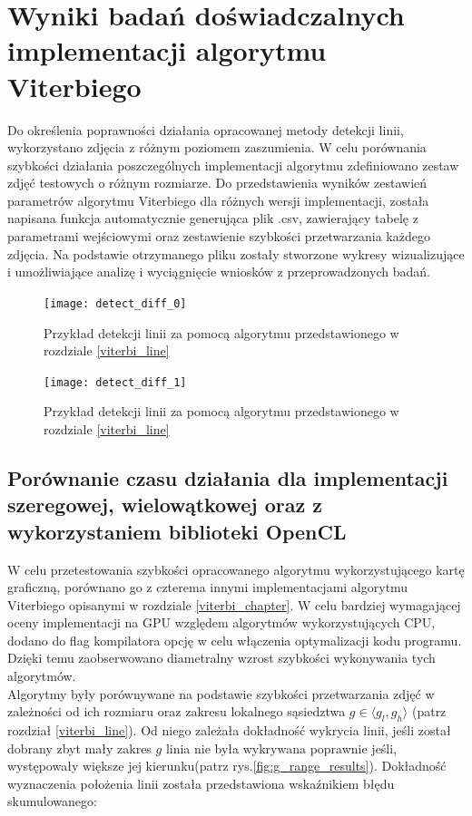 \documentclass[document.tex]{subfiles}
\begin{document}
\chapter{Wyniki badań doświadczalnych \\ implementacji algorytmu Viterbiego} \label{chapter_3}
\indent Do określenia poprawności działania opracowanej metody detekcji linii, 
wykorzystano zdjęcia z różnym poziomem zaszumienia. W celu porównania szybkości
działania poszczególnych implementacji algorytmu zdefiniowano zestaw zdjęć testowych
o różnym rozmiarze. Do przedstawienia wyników zestawień parametrów algorytmu Viterbiego
dla różnych wersji implementacji, została napisana funkcja automatycznie generująca plik .csv,
zawierający tabelę z parametrami wejściowymi oraz zestawienie szybkości przetwarzania każdego zdjęcia.
Na podstawie otrzymanego pliku zostały stworzone wykresy wizualizujące i umożliwiające
analizę i wyciągnięcie wniosków z przeprowadzonych badań.

\begin{figure}[h]
\texttt{[image: detect\_diff\_0]}
\caption{Przykład detekcji linii za pomocą algorytmu przedstawionego w rozdziale \ref{viterbi_line}}
\label{fig:sample_detect_0}
\end{figure}

\clearpage

\begin{figure}[h]
\texttt{[image: detect\_diff\_1]}
\caption{Przykład detekcji linii za pomocą algorytmu przedstawionego w rozdziale \ref{viterbi_line}}
\label{fig:sample_detect_1}
\end{figure}

\section{Porównanie czasu działania dla implementacji szeregowej, wielowątkowej
oraz z wykorzystaniem biblioteki OpenCL}
\indent W celu przetestowania szybkości opracowanego algorytmu wykorzystującego
kartę graficzną, porównano go z czterema innymi implementacjami algorytmu Viterbiego opisanymi
w rozdziale \ref{viterbi_chapter}.
W celu bardziej wymagającej oceny implementacji na GPU względem algorytmów wykorzystujących CPU, dodano
do flag kompilatora opcję  w celu włączenia optymalizacji kodu programu.
Dzięki temu zaobserwowano diametralny wzrost szybkości wykonywania tych algorytmów.
\\
\indent Algorytmy były porównywane na podstawie szybkości przetwarzania zdjęć
w zależności od ich rozmiaru oraz zakresu lokalnego sąsiedztwa $g\in \langle g_l, g_h \rangle$
(patrz rozdział \ref{viterbi_line}). Od niego zależała dokładność wykrycia linii, 
jeśli został dobrany zbyt mały zakres $g$ linia nie była wykrywana poprawnie jeśli, 
występowały większe jej kierunku(patrz rys.\ref{fig:g_range_results}). Dokładność wyznaczenia położenia linii
została przedstawiona wskaźnikiem błędu skumulowanego:
\end{document}
